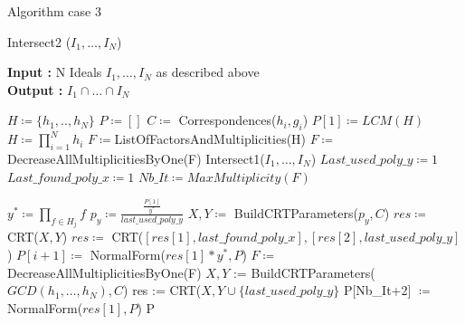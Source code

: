 \documentclass{beamer}
\begin{document}
\begin{frame}{Algorithm case 3}
    \begin{algorithm}[H]    \tiny
    \caption{Intersect2 ($I_{1},\dots,I_{N}$)}\label{alg:intersect-2-ideals-diff-gcd}
    \textbf{Input : } N Ideals $I_{1},\dots,I_{N}$ as described above \\
    \textbf{Output : }$I_{1} \cap \dots\cap I_ {N}$
\begin{algorithmic}
    \State $H \coloneqq \{h_{1},..,h_{N}\}$
    \State $P \coloneqq []$
    \State $C \coloneqq $ Correspondences($h_{i},g_{i}$) 
    \State $P[1] \coloneqq LCM(H)$
    \State $H \coloneqq \prod^{N}_{i=1} h_{i}$
    \State $F \coloneqq $ListOfFactorsAndMultiplicities(H)
    \State $F \coloneqq $DecreaseAllMultiplicitiesByOne(F)
        \State \Return Intersect1($I_{1},\dots,I_{N}$)
    \EndIf
    \State $Last\_used\_poly\_y \coloneqq 1$
    \State $Last\_found\_poly\_x \coloneqq 1$
    \State $Nb\_It \coloneqq MaxMultiplicity(F) $ 

        \State $y^{*}\coloneqq \prod_{f \in H_{j}} f$ 
        \State $p_y\coloneqq \frac{\frac{P[1]}{y^{*}}}{last\_used\_poly\_y}$ 
        \State $X, Y\coloneqq$ BuildCRTParameters($p_y, C$)
        \State $res \coloneqq $ CRT($X,Y$)
            \State $res \coloneqq $ CRT($[res[1],last\_found\_poly\_x],[res[2],last\_used\_poly\_y]$)
        \EndIf
        \State $P[i+1] \coloneqq $ NormalForm($res[1]*y^{*},P$)
        \State $F \coloneqq $ DecreaseAllMultiplicitiesByOne(F)
    \EndFor
    \State $X,Y$ := BuildCRTParameters($GCD(h_{1},\dots,h_{N}),C$)
    \State res := CRT($X,Y\cup\{last\_used\_poly\_y\}$
    \State P[Nb\_It+2] $\coloneqq $NormalForm($res[1],P$)
    \State \Return P

\end{algorithmic}
\end{algorithm}

\end{frame}
\end{document}
